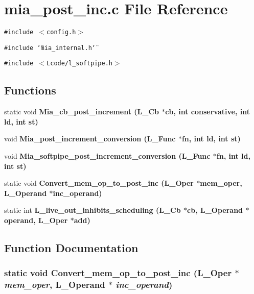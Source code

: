 \section{mia\_\-post\_\-inc.c File Reference}
\label{mia__post__inc_8c}
{\tt \#include $<$config.h$>$}\par
{\tt \#include \char`\"{}mia\_\-internal.h\char`\"{}}\par
{\tt \#include $<$Lcode/l\_\-softpipe.h$>$}\par
\subsection*{Functions}
\begin{CompactItemize}
\item 
static void \bf{Mia\_\-cb\_\-post\_\-increment} (L\_\-Cb $\ast$cb, int conservative, int ld, int st)
\item 
void \bf{Mia\_\-post\_\-increment\_\-conversion} (L\_\-Func $\ast$fn, int ld, int st)
\item 
void \bf{Mia\_\-softpipe\_\-post\_\-increment\_\-conversion} (L\_\-Func $\ast$fn, int ld, int st)
\item 
static void \bf{Convert\_\-mem\_\-op\_\-to\_\-post\_\-inc} (L\_\-Oper $\ast$mem\_\-oper, L\_\-Operand $\ast$inc\_\-operand)
\item 
static int \bf{L\_\-live\_\-out\_\-inhibits\_\-scheduling} (L\_\-Cb $\ast$cb, L\_\-Operand $\ast$operand, L\_\-Oper $\ast$add)
\end{CompactItemize}


\subsection{Function Documentation}
\subsubsection{\setlength{\rightskip}{0pt plus 5cm}static void Convert\_\-mem\_\-op\_\-to\_\-post\_\-inc (L\_\-Oper $\ast$ {\em mem\_\-oper}, L\_\-Operand $\ast$ {\em inc\_\-operand})\hspace{0.3cm}{\tt  [static]}}\label{mia__post__inc_8c_cc3b1a3c4ed81392623e05754cfc23c3}




